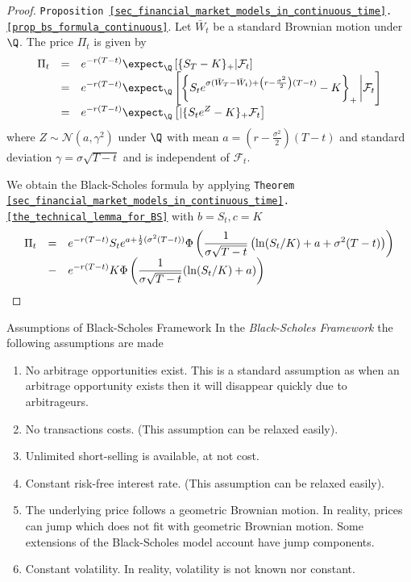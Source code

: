 \documentclass[11pt,a4paper]{article}
\begin{document}
  \begin{proof}{\texttt{Proposition \ref{sec_financial_market_models_in_continuous_time}.\ref{prop_bs_formula_continuous}}.}
    Let $\bar{W}_t$ be a standard Brownian motion under $\Q$. The price $\Pi_t$ is given by
    \[\everymath={\displaystyle}\begin{array}{rcl}
      \Pi_t&=&e^{-r(T-t)}\expect_\Q\left[\{S_T-K\}_+|\mathcal{F}_t\right]\\
      &=&e^{-r(T-t)}\expect_\Q\left[\left\{S_t e^{\sigma(\bar{W}_T-\bar{W}_t)+\left(r-\frac{\sigma^2}2\right)(T-t)}-K\right\}_+\bigg|\mathcal{F}_t\right]\\
      &=&e^{-r(T-t)}\expect_\Q\left[|\{S_te^Z-K\}_+\mathcal{F}_t\right]
    \end{array}\]
    where $Z\sim\mathcal{N}(a,\gamma^2)$ under $\Q$ with mean $a=\left(r-\frac{\sigma^2}2\right)(T-t)$ and standard deviation $\gamma=\sigma\sqrt{T-t}$ and is independent of $\mathcal{F}_t$.
    \par We obtain the Black-Scholes formula by applying \texttt{Theorem \ref{sec_financial_market_models_in_continuous_time}.\ref{the_technical_lemma_for_BS}} with $b=S_t,c=K$
    \[\everymath={\displaystyle}\begin{array}{rcl}
      \Pi_t&=&e^{-r(T-t)}S_te^{a+\frac12(\sigma^2(T-t))}\Phi\left(\frac1{\sigma\sqrt{T-t}}\left(\ln(S_t/K)+a+\sigma^2(T-t)\right)\right)\\
      &-&e^{-r(T-t)}K\Phi\left(\frac1{\sigma\sqrt{T-t}}(\ln(S_t/K)+a)\right)
    \end{array}\]
    \proved
  \end{proof}

  \begin{remark}{Assumptions of Black-Scholes Framework}
    In the \textit{Black-Scholes Framework} the following assumptions are made
    \begin{enumerate}
      \item No arbitrage opportunities exist. This is a standard assumption as when an arbitrage opportunity exists then it will disappear quickly due to arbitrageurs.
      \item No transactions costs. (This assumption can be relaxed easily).
      \item Unlimited short-selling is available, at not cost.
      \item Constant risk-free interest rate. (This assumption can be relaxed easily).
      \item The underlying price follows a geometric Brownian motion. In reality, prices can jump which does not fit with geometric Brownian motion. Some extensions of the Black-Scholes model account have jump components.
      \item Constant volatility. In reality, volatility is not known nor constant.
    \end{enumerate}
  \end{remark}
\end{document}
